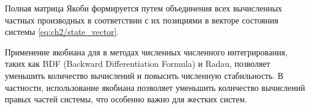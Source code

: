 Полная матрица Якоби формируется путем объединения всех вычисленных частных производных в
соответствии с их позициями в векторе состояния системы \eqref{eq:ch2/state_vector}.

Применение якобиана для в методах численных численного интегрирования, таких как
BDF (Backward Differentiation Formula) и Radau, позволяет уменьшить количество вычислений
и повысить численную стабильность. В частности, использование якобиана позволяет
уменьшить количество вычислений правых частей системы, что особенно важно для жестких систем.